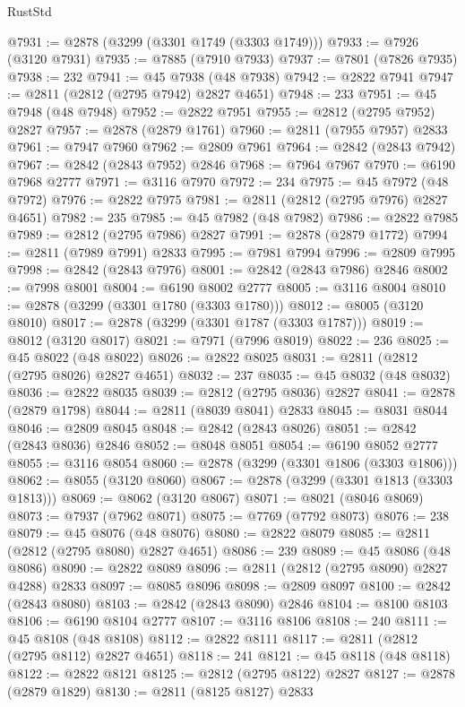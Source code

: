 \begin{lexlean}{RustStd}
\begin{coremodule}
@7931 := @2878 (@3299 (@3301 @1749 (@3303 @1749)))
@7933 := @7926 (@3120 @7931)
@7935 := @7885 (@7910 @7933)
@7937 := @7801 (@7826 @7935)
@7938 := 232
@7941 := @45 @7938 (@48 @7938)
@7942 := @2822 @7941
@7947 := @2811 (@2812 (@2795 @7942) @2827 @4651)
@7948 := 233
@7951 := @45 @7948 (@48 @7948)
@7952 := @2822 @7951
@7955 := @2812 (@2795 @7952) @2827
@7957 := @2878 (@2879 @1761)
@7960 := @2811 (@7955 @7957) @2833
@7961 := @7947 @7960
@7962 := @2809 @7961
@7964 := @2842 (@2843 @7942)
@7967 := @2842 (@2843 @7952) @2846
@7968 := @7964 @7967
@7970 := @6190 @7968 @2777
@7971 := @3116 @7970
@7972 := 234
@7975 := @45 @7972 (@48 @7972)
@7976 := @2822 @7975
@7981 := @2811 (@2812 (@2795 @7976) @2827 @4651)
@7982 := 235
@7985 := @45 @7982 (@48 @7982)
@7986 := @2822 @7985
@7989 := @2812 (@2795 @7986) @2827
@7991 := @2878 (@2879 @1772)
@7994 := @2811 (@7989 @7991) @2833
@7995 := @7981 @7994
@7996 := @2809 @7995
@7998 := @2842 (@2843 @7976)
@8001 := @2842 (@2843 @7986) @2846
@8002 := @7998 @8001
@8004 := @6190 @8002 @2777
@8005 := @3116 @8004
@8010 := @2878 (@3299 (@3301 @1780 (@3303 @1780)))
@8012 := @8005 (@3120 @8010)
@8017 := @2878 (@3299 (@3301 @1787 (@3303 @1787)))
@8019 := @8012 (@3120 @8017)
@8021 := @7971 (@7996 @8019)
@8022 := 236
@8025 := @45 @8022 (@48 @8022)
@8026 := @2822 @8025
@8031 := @2811 (@2812 (@2795 @8026) @2827 @4651)
@8032 := 237
@8035 := @45 @8032 (@48 @8032)
@8036 := @2822 @8035
@8039 := @2812 (@2795 @8036) @2827
@8041 := @2878 (@2879 @1798)
@8044 := @2811 (@8039 @8041) @2833
@8045 := @8031 @8044
@8046 := @2809 @8045
@8048 := @2842 (@2843 @8026)
@8051 := @2842 (@2843 @8036) @2846
@8052 := @8048 @8051
@8054 := @6190 @8052 @2777
@8055 := @3116 @8054
@8060 := @2878 (@3299 (@3301 @1806 (@3303 @1806)))
@8062 := @8055 (@3120 @8060)
@8067 := @2878 (@3299 (@3301 @1813 (@3303 @1813)))
@8069 := @8062 (@3120 @8067)
@8071 := @8021 (@8046 @8069)
@8073 := @7937 (@7962 @8071)
@8075 := @7769 (@7792 @8073)
@8076 := 238
@8079 := @45 @8076 (@48 @8076)
@8080 := @2822 @8079
@8085 := @2811 (@2812 (@2795 @8080) @2827 @4651)
@8086 := 239
@8089 := @45 @8086 (@48 @8086)
@8090 := @2822 @8089
@8096 := @2811 (@2812 (@2795 @8090) @2827 @4288) @2833
@8097 := @8085 @8096
@8098 := @2809 @8097
@8100 := @2842 (@2843 @8080)
@8103 := @2842 (@2843 @8090) @2846
@8104 := @8100 @8103
@8106 := @6190 @8104 @2777
@8107 := @3116 @8106
@8108 := 240
@8111 := @45 @8108 (@48 @8108)
@8112 := @2822 @8111
@8117 := @2811 (@2812 (@2795 @8112) @2827 @4651)
@8118 := 241
@8121 := @45 @8118 (@48 @8118)
@8122 := @2822 @8121
@8125 := @2812 (@2795 @8122) @2827
@8127 := @2878 (@2879 @1829)
@8130 := @2811 (@8125 @8127) @2833

\end{coremodule}
\end{lexlean}
